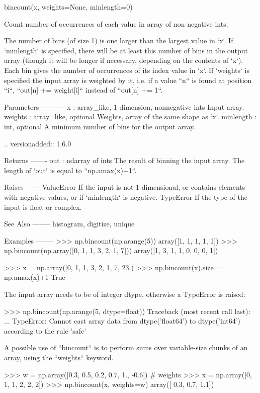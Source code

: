 \begin{DoxyVerb}bincount(x, weights=None, minlength=0)

Count number of occurrences of each value in array of non-negative ints.

The number of bins (of size 1) is one larger than the largest value in
`x`. If `minlength` is specified, there will be at least this number
of bins in the output array (though it will be longer if necessary,
depending on the contents of `x`).
Each bin gives the number of occurrences of its index value in `x`.
If `weights` is specified the input array is weighted by it, i.e. if a
value ``n`` is found at position ``i``, ``out[n] += weight[i]`` instead
of ``out[n] += 1``.

Parameters
----------
x : array_like, 1 dimension, nonnegative ints
    Input array.
weights : array_like, optional
    Weights, array of the same shape as `x`.
minlength : int, optional
    A minimum number of bins for the output array.

    .. versionadded:: 1.6.0

Returns
-------
out : ndarray of ints
    The result of binning the input array.
    The length of `out` is equal to ``np.amax(x)+1``.

Raises
------
ValueError
    If the input is not 1-dimensional, or contains elements with negative
    values, or if `minlength` is negative.
TypeError
    If the type of the input is float or complex.

See Also
--------
histogram, digitize, unique

Examples
--------
>>> np.bincount(np.arange(5))
array([1, 1, 1, 1, 1])
>>> np.bincount(np.array([0, 1, 1, 3, 2, 1, 7]))
array([1, 3, 1, 1, 0, 0, 0, 1])

>>> x = np.array([0, 1, 1, 3, 2, 1, 7, 23])
>>> np.bincount(x).size == np.amax(x)+1
True

The input array needs to be of integer dtype, otherwise a
TypeError is raised:

>>> np.bincount(np.arange(5, dtype=float))
Traceback (most recent call last):
  ...
TypeError: Cannot cast array data from dtype('float64') to dtype('int64')
according to the rule 'safe'

A possible use of ``bincount`` is to perform sums over
variable-size chunks of an array, using the ``weights`` keyword.

>>> w = np.array([0.3, 0.5, 0.2, 0.7, 1., -0.6]) # weights
>>> x = np.array([0, 1, 1, 2, 2, 2])
>>> np.bincount(x,  weights=w)
array([ 0.3,  0.7,  1.1])\end{DoxyVerb}
 \mbox{\label{namespacenumpy_1_1core_1_1multiarray_a03866a1d6f9ba260909213d4356fedda}} 
